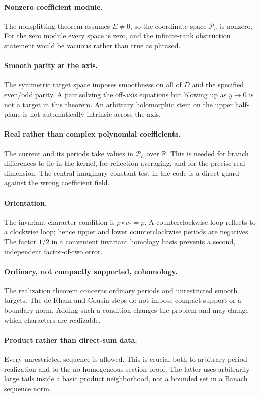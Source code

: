 \documentclass[11pt,a4paper]{article}
\numberwithin{equation}{section}
\theoremstyle{definition}
\theoremstyle{remark}
\newcommand{\R}{\mathbb R}
\newcommand{\Pspace}{\mathscr P_h}
\begin{document}
\paragraph{Nonzero coefficient module.}
The nonsplitting theorem assumes $E\ne0$, so the coordinate space $\Pspace$
is nonzero. For the zero module every space is zero, and the infinite-rank
obstruction statement would be vacuous rather than true as phrased.

\paragraph{Smooth parity at the axis.}
The symmetric target space imposes smoothness on all of $D$ and the specified
even/odd parity. A pair solving the off-axis equations but blowing up as
$y\to0$ is not a target in this theorem. An arbitrary holomorphic stem on the
upper half-plane is not automatically intrinsic across the axis.

\paragraph{Real rather than complex polynomial coefficients.}
The current and its periods take values in $\Pspace$ over $\R$. This is needed
for branch differences to lie in the kernel, for reflection averaging, and
for the precise real dimension. The central-imaginary constant test in the
code is a direct guard against the wrong coefficient field.

\paragraph{Orientation.}
The invariant-character condition is $\rho\circ c_*=\rho$. A
counterclockwise loop reflects to a clockwise loop; hence upper and lower
counterclockwise periods are negatives. The factor $1/2$ in a convenient
invariant homology basis prevents a second, independent factor-of-two error.

\paragraph{Ordinary, not compactly supported, cohomology.}
The realization theorem concerns ordinary periods and unrestricted smooth
targets. The de Rham and Cousin steps do not impose compact support or a
boundary norm. Adding such a condition changes the problem and may change
which characters are realizable.

\paragraph{Product rather than direct-sum data.}
Every unrestricted sequence is allowed. This is crucial both to arbitrary
period realization and to the no-homogeneous-section proof. The latter uses
arbitrarily large tails inside a basic product neighborhood, not a bounded
set in a Banach sequence norm.
\end{document}
